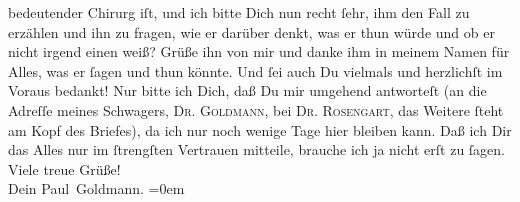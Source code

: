 \begin{ledgroupsized}[t]{13cm}
               bedeutender Chirurg iſt, und ich bitte Dich nun recht ſehr, ihm  den Fall zu erzählen und ihn zu fragen, wie er darüber denkt, was er thun
               würde und ob er nicht irgend einen \label{K-L03243-3v}\label{K-L03243-3h} weiß? Grüße ihn von mir und danke ihm in
               meinem Namen für Alles, was er ſagen und thun könnte. Und ſei auch Du vielmals und
                  {\pb}herzlichſt im Voraus bedankt! Nur bitte ich
               Dich, daß Du mir umgehend antworteſt (an die Adreſſe meines Schwagers, \textsc{Dr.
                  Goldmann}, bei \textsc{Dr. }\textsc{Rosengart}, das Weitere ſteht am Kopf des Briefes), da ich nur noch wenige Tage hier bleiben kann.\pend
           \pstart
           Daß ich Dir das Alles nur im ſtrengſten Vertrauen mitteile, brauche ich ja nicht erſt
               zu ſagen.\pend
           \pstart
           Viele treue Grüße! {\\[\baselineskip]}Dein \spacefill\mbox{Paul Goldmann.}\pend
           \leftskip=0em{}
         
         \endnumbering{}\end{ledgroupsized}\begin{anhang}\end{anhang}\newcommand{\dateiname}{L03243}\newcommand{\titel}{Paul Goldmann an Arthur Schnitzler, 16. 4. [1906]}\newcommand{\editorInnen}{Martin Anton Müller und Laura Untner}
      